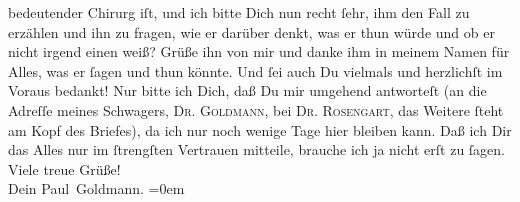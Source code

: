 \begin{ledgroupsized}[t]{13cm}
               bedeutender Chirurg iſt, und ich bitte Dich nun recht ſehr, ihm  den Fall zu erzählen und ihn zu fragen, wie er darüber denkt, was er thun
               würde und ob er nicht irgend einen \label{K-L03243-3v}\label{K-L03243-3h} weiß? Grüße ihn von mir und danke ihm in
               meinem Namen für Alles, was er ſagen und thun könnte. Und ſei auch Du vielmals und
                  {\pb}herzlichſt im Voraus bedankt! Nur bitte ich
               Dich, daß Du mir umgehend antworteſt (an die Adreſſe meines Schwagers, \textsc{Dr.
                  Goldmann}, bei \textsc{Dr. }\textsc{Rosengart}, das Weitere ſteht am Kopf des Briefes), da ich nur noch wenige Tage hier bleiben kann.\pend
           \pstart
           Daß ich Dir das Alles nur im ſtrengſten Vertrauen mitteile, brauche ich ja nicht erſt
               zu ſagen.\pend
           \pstart
           Viele treue Grüße! {\\[\baselineskip]}Dein \spacefill\mbox{Paul Goldmann.}\pend
           \leftskip=0em{}
         
         \endnumbering{}\end{ledgroupsized}\begin{anhang}\end{anhang}\newcommand{\dateiname}{L03243}\newcommand{\titel}{Paul Goldmann an Arthur Schnitzler, 16. 4. [1906]}\newcommand{\editorInnen}{Martin Anton Müller und Laura Untner}
      